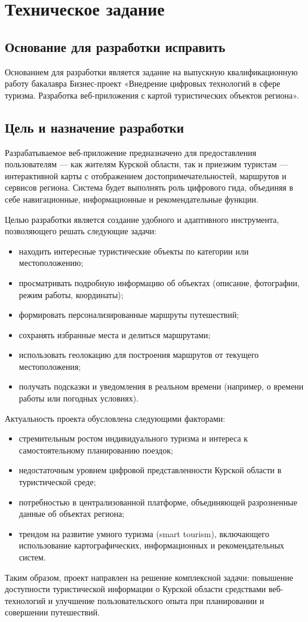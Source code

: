 \section{Техническое задание}
\subsection{Основание для разработки исправить}

Основанием для разработки является задание на выпускную квалификационную работу бакалавра Бизнес-проект «Внедрение цифровых технологий в сфере туризма. Разработка веб-приложения с картой туристических объектов региона».

\subsection{Цель и назначение разработки}

Разрабатываемое веб-приложение предназначено для предоставления пользователям — как жителям Курской области, так и приезжим туристам — интерактивной карты с отображением достопримечательностей, маршрутов и сервисов региона. Система будет выполнять роль цифрового гида, объединяя в себе навигационные, информационные и рекомендательные функции.

Целью разработки является создание удобного и адаптивного инструмента, позволяющего решать следующие задачи:
\begin{itemize}
	\item находить интересные туристические объекты по категории или местоположению;
	\item просматривать подробную информацию об объектах (описание, фотографии, режим работы, координаты);
	\item формировать персонализированные маршруты путешествий;
	\item сохранять избранные места и делиться маршрутами;
	\item использовать геолокацию для построения маршрутов от текущего местоположения;
	\item получать подсказки и уведомления в реальном времени (например, о времени работы или погодных условиях).
\end{itemize}

Актуальность проекта обусловлена следующими факторами:
\begin{itemize}
	\item стремительным ростом индивидуального туризма и интереса к самостоятельному планированию поездок;
	\item недостаточным уровнем цифровой представленности Курской области в туристической среде;
	\item потребностью в централизованной платформе, объединяющей разрозненные данные об объектах региона;
	\item трендом на развитие умного туризма (smart tourism), включающего использование картографических, информационных и рекомендательных систем.
\end{itemize}
Таким образом, проект направлен на решение комплексной задачи: повышение доступности туристической информации о Курской области средствами веб-технологий и улучшение пользовательского опыта при планировании и совершении путешествий.


